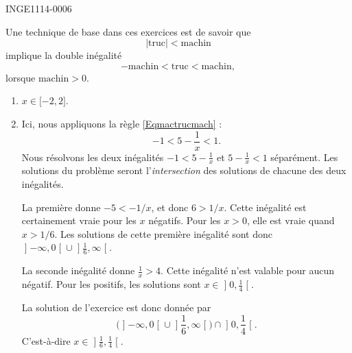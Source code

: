 

\begin{corrige}{INGE1114-0006}

	Une technique de base dans ces exercices est de savoir que
	\begin{equation}
		| \text{truc} |<\text{machin}
	\end{equation}
	implique la double inégalité
	\begin{equation}					\label{Eqmactrucmach}
		-\text{machin}<\text{truc}<\text{machin},
	\end{equation}
	lorsque $\text{machin}>0$.


	\begin{enumerate}

		\item
			$x\in\mathopen[ -2 , 2 \mathclose]$.
		\item
			Ici, nous appliquons la règle \eqref{Eqmactrucmach} :
			\begin{equation}
				-1<5-\frac{1}{ x }<1.
			\end{equation}
            Nous résolvons les deux inégalités \( -1<5-\frac{ 1 }{ x }\) et \( 5-\frac{ 1 }{ x }<1\) séparément. Les solutions du problème seront l'\emph{intersection} des solutions de chacune des deux inégalités. 

			La première donne $-5<-1/x$, et donc $6>1/x$. Cette inégalité est certainement vraie pour les $x$ négatifs. Pour les $x>0$, elle est vraie quand $x>1/6$. Les solutions de cette première inégalité sont donc $\mathopen] -\infty , 0 \mathclose[\cup\mathopen] \frac{1}{ 6 } , \infty \mathclose[$.

			La seconde inégalité donne $\frac{1}{ x }>4$. Cette inégalité n'est valable pour aucun négatif. Pour les positifs, les solutions sont $x\in\mathopen] 0 , \frac{1}{ 4 } \mathclose[$.

			La solution de l'exercice est donc donnée par
			\begin{equation}
				\Big(    \mathopen] -\infty , 0 \mathclose[\cup\mathopen] \frac{1}{ 6 } , \infty \mathclose[  \Big)\cap \mathopen] 0, \frac{1}{ 4 } \mathclose[.
			\end{equation}
			C'est-à-dire $x\in\mathopen] \frac{1}{ 6 } , \frac{1}{ 4 } \mathclose[$.



\end{enumerate}
\end{corrige}
